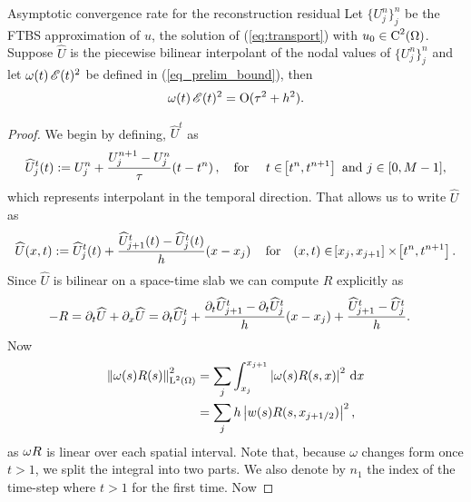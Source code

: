\documentclass[final]{amsart}
\renewcommand{\d}{\ensuremath{\,\mathrm{d}}}
\numberwithin{equation}{section}
\begin{document}
\begin{Lem}{Asymptotic convergence rate for the reconstruction residual}
  \label{subsec:asymptotic_convergence_rate}
  Let $\{ U^n_j \}_{j}^{n}$ be the FTBS approximation of $u$, the
  solution of (\ref{eq:transport}) with $u_0 \in
  \operatorname C^{2}(\Omega)$. Suppose $\widehat U$ is the piecewise bilinear
  interpolant of the nodal values of $\{ U^n_j \}_{j}^{n}$ and let
  $\omega\!\left({t}\right)\mathscr E(t)^2$ be defined in (\ref{eq_prelim_bound}), then
  \begin{equation}
    \omega\!\left({t}\right)\mathscr E(t)^2 = \operatorname{O}(\tau^2 + h^2).
  \end{equation}
\end{Lem}
\begin{proof}
We begin by defining, $\widehat{U}^t$ as
\begin{equation}
  \widehat{U}^t_j\!\left({t}\right)
  :=
  U^n_j +\frac{U^{n+1}_j
    -
    U^n_j}{\tau}\!\left({t-t^n}\right), \quad \text{for }\quad t \in \!\left[{t^n,
    t^{n+1}}\right]  \text{ and } j\in [0,M-1],
\end{equation}
which represents interpolant in the temporal direction. That allows us
to write $\widehat{U}$ as
\begin{equation}
  \widehat{U}\qp{x,t}
  :=
  \widehat{U}^t_j\qp{t} + \frac{\widehat{U}_{j+1}^t\qp{t}-\widehat{U}_j^t\qp{t} }{h}\qp{x-x_j}\quad\text{for}\quad \qp{x,t}\in \qb{x_j, x_{j+1}}\times\qb{t^n, t^{n+1}}.
\end{equation}
Since $\widehat{U}$ is bilinear on a space-time slab we can compute
$R$ explicitly as
\begin{equation}
  \label{eq:Reqn}
  \begin{aligned}
    -R
    =
    \partial_t \widehat{U}
    +
    \partial_x \widehat{U}
    &=
    \partial_t \widehat{U}^t_j
    +
    \frac{\partial_t\widehat{U}_{j+1}^t-\partial_t\widehat{U}_j^t}{h}\!\left({x-x_j}\right)
    +
    \frac{\widehat{U}_{j+1}^t-\widehat{U}_j^t}{h}.
\end{aligned}
\end{equation}
Now
\begin{equation}
  \begin{split}
    \Norm{\w(s) R(s)}_{\leb{2}(\W)}^2
    &=
    \sum_{j} \int_{x_j}^{x_{j+1}} \norm{\w(s) R(s,x)}^2 \d x
    \\
    &=
    \sum_{j} h \norm{w(s) R(s, x_{j+1/2})}^2,
  \end{split}
\end{equation}
as $\omega R$ is linear over each spatial interval. Note that, because $\omega$ changes form once $t>1$, we split the integral into two parts.  We also denote by $n_1$ the index of the time-step where $t>1$ for the first time. Now

\end{proof}
\end{document}
